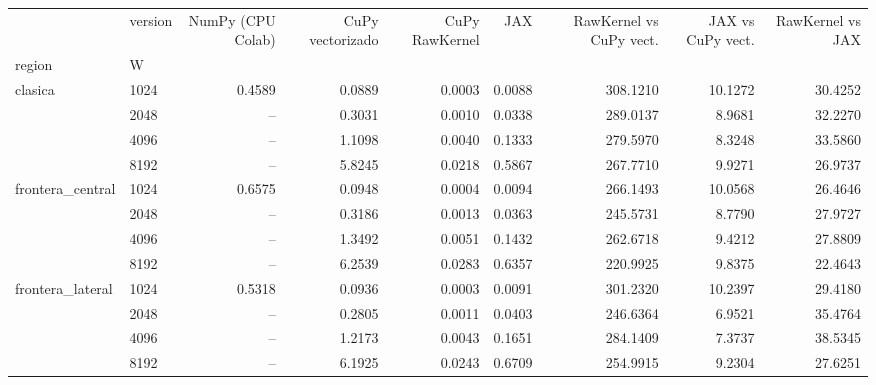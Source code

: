 \begin{tabular}{llrrrrrrr}
\toprule
 & version & NumPy (CPU Colab) & CuPy vectorizado & CuPy RawKernel & JAX & RawKernel vs CuPy vect. & JAX vs CuPy vect. & RawKernel vs JAX \\
region & W &  &  &  &  &  &  &  \\
\midrule
\multirow[t]{4}{*}{clasica} & 1024 & 0.4589 & 0.0889 & 0.0003 & 0.0088 & 308.1210 & 10.1272 & 30.4252 \\
 & 2048 & -- & 0.3031 & 0.0010 & 0.0338 & 289.0137 & 8.9681 & 32.2270 \\
 & 4096 & -- & 1.1098 & 0.0040 & 0.1333 & 279.5970 & 8.3248 & 33.5860 \\
 & 8192 & -- & 5.8245 & 0.0218 & 0.5867 & 267.7710 & 9.9271 & 26.9737 \\
\cline{1-9}
\multirow[t]{4}{*}{frontera_central} & 1024 & 0.6575 & 0.0948 & 0.0004 & 0.0094 & 266.1493 & 10.0568 & 26.4646 \\
 & 2048 & -- & 0.3186 & 0.0013 & 0.0363 & 245.5731 & 8.7790 & 27.9727 \\
 & 4096 & -- & 1.3492 & 0.0051 & 0.1432 & 262.6718 & 9.4212 & 27.8809 \\
 & 8192 & -- & 6.2539 & 0.0283 & 0.6357 & 220.9925 & 9.8375 & 22.4643 \\
\cline{1-9}
\multirow[t]{4}{*}{frontera_lateral} & 1024 & 0.5318 & 0.0936 & 0.0003 & 0.0091 & 301.2320 & 10.2397 & 29.4180 \\
 & 2048 & -- & 0.2805 & 0.0011 & 0.0403 & 246.6364 & 6.9521 & 35.4764 \\
 & 4096 & -- & 1.2173 & 0.0043 & 0.1651 & 284.1409 & 7.3737 & 38.5345 \\
 & 8192 & -- & 6.1925 & 0.0243 & 0.6709 & 254.9915 & 9.2304 & 27.6251 \\
\cline{1-9}
\bottomrule
\end{tabular}
